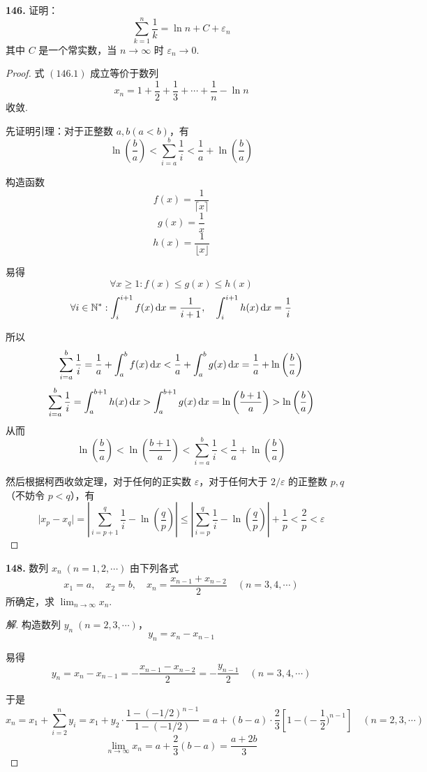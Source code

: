 \textbf{146.} 证明：
\[\sum_{k=1}^{n} \frac{1}{k} = \ln n + C + \varepsilon_n \tag{146.1}\]
其中 $C$ 是一个常实数，当 $n \rightarrow \infty$ 时 $\varepsilon_n \rightarrow 0$.
\begin{proof}
    式 $(146.1)$ 成立等价于数列
    \[x_n = 1 + \frac{1}{2} + \frac{1}{3} + \cdots + \frac{1}{n} - \ln n\]
    收敛.

    先证明引理：对于正整数 $a,b(a < b)$，有
    \[\ln\left(\frac{b}{a}\right) < \sum_{i=a}^{b} \frac{1}{i} < \frac{1}{a} + \ln \left(\frac{b}{a}\right)\]

    构造函数
    \[f(x) = \frac{1}{\lceil x \rceil}\]
    \[g(x) = \frac{1}{x}\]
    \[h(x) = \frac{1}{\lfloor x\rfloor}\]

    易得
    \[\forall x \geqslant 1: f(x) \leqslant g(x) \leqslant h(x)\]
    \[\forall i \in \mathbb{N}^*: \int_{i}^{i+1} f(x) \mathop{}\!\mathrm{d} x = \frac{1}{i+1},\quad \int_{i}^{i+1}h(x) \mathop{}\!\mathrm{d} x = \frac{1}{i}\]

    所以
    \[\sum_{i=a}^{b} \frac{1}{i} = \frac{1}{a} + \int_a^b f(x) \mathop{}\!\mathrm{d} x < \frac{1}{a} + \int_a^b g(x) \mathop{}\!\mathrm{d} x = \frac{1}{a} + \ln\left(\frac{b}{a}\right)\]
    \[\sum_{i=a}^{b} \frac{1}{i} = \int_a^{b+1} h(x) \mathop{}\!\mathrm{d} x > \int_a^{b+1} g(x) \mathop{}\!\mathrm{d} x = \ln\left(\frac{b+1}{a}\right) > \ln \left(\frac{b}{a}\right)\]
    从而
    \[\ln\left(\frac{b}{a}\right) < \ln \left(\frac{b + 1}{a}\right) < \sum_{i=a}^{b} \frac{1}{i} < \frac{1}{a} + \ln \left(\frac{b}{a}\right)\]

    然后根据柯西收敛定理，对于任何的正实数 $\varepsilon$，对于任何大于 $2/\varepsilon$ 的正整数 $p,q$（不妨令 $p < q$），有
    \[\lvert x_p - x_q \rvert = \left\vert \sum_{i=p+1}^{q} \frac{1}{i} - \ln \left(\frac{q}{p}\right) \right\vert \leqslant \left\vert \sum_{i=p}^{q} \frac{1}{i} - \ln \left(\frac{q}{p}\right) \right\vert + \frac{1}{p} < \frac{2}{p} < \varepsilon\]
\end{proof}\vspace{9pt}

\textbf{148.} 数列 $x_n \;(n=1,2,\cdots)$ 由下列各式
\[x_1 = a, \quad x_2 = b, \quad x_n = \frac{x_{n-1} + x_{n-2}}{2} \quad (n=3,4,\cdots)\]
所确定，求 $\displaystyle \lim_{n \rightarrow \infty} x_n$.
\begin{proof}[解]
    构造数列 $y_n \;(n = 2,3,\cdots)$，
    \[y_n = x_n - x_{n-1}\]

    易得
    \[y_n = x_n - x_{n-1} = -\frac{x_{n-1} - x_{n-2}}{2} = -\frac{y_{n-1}}{2} \quad (n = 3,4,\cdots)\]

    于是
    \[x_n = x_1 + \sum_{i=2}^{n} y_i = x_1 + y_2 \cdot \frac{1 - (-1/2)^{n-1}}{1 - (-1/2)} = a + (b-a) \cdot \frac{2}{3} \left[1 - \biggl(-\frac{1}{2}\biggr)^{n-1}\right] \quad (n=2,3,\cdots)\]
    \[\lim_{n \rightarrow \infty} x_n = a + \frac{2}{3}(b-a) = \frac{a + 2b}{3}\]
\end{proof}\vspace{9pt}

